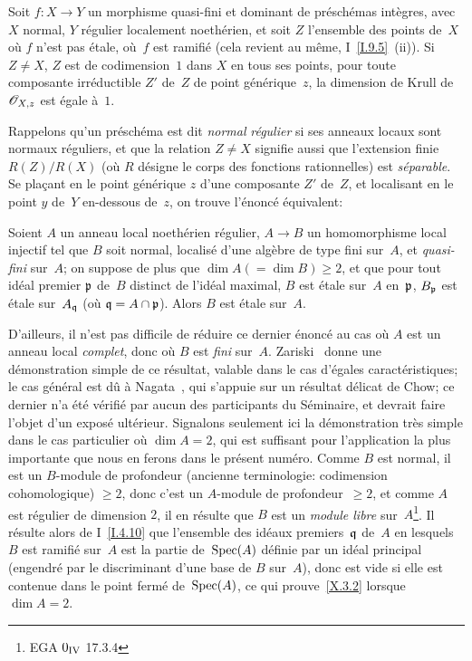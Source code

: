 \begin{theoremedepurete}
\label{X.3.1}
Soit $f\colon X\to Y$ un morphisme
quasi-fini et dominant de pr\'esch\'emas int\`egres, avec $X$
normal, $Y$ r\'egulier localement noeth\'erien, et soit $Z$
l'ensemble des points de~$X$ o\`u $f$ n'est pas \'etale,
\ie o\`u~$f$ est ramifi\'e (cela revient au m\^eme,
\textup{I~\ref{I.9.5}~(ii)}). Si $Z\ne X$, $Z$ est de codimension~$1$ dans
$X$ en tous ses points, \ie pour toute composante irr\'eductible
$Z'$ de~$Z$ de point g\'en\'erique~$z$, la dimension de Krull de
$\cal{O}_{X,z}$ est \'egale \`a~$1$.
\end{theoremedepurete}

Rappelons qu'un pr\'esch\'ema est dit \emph{normal}
\resp \emph{régulier} si ses anneaux locaux sont normaux
\resp r\'eguliers, et que la relation $Z\ne X$ signifie aussi que
l'extension finie $R(Z)/R(X)$ (o\`u $R$ d\'esigne le corps des
fonctions rationnelles) est \emph{séparable}. Se pla\c cant en
le point g\'en\'erique $z$ d'une composante $Z'$ de~$Z$, et
localisant en le point $y$ de~$Y$ en-dessous de~$z$, on trouve
l'\'enonc\'e \'equivalent:

\begin{corollaire}
\label{X.3.2}
Soient $A$ un anneau local noeth\'erien r\'egulier, $A\to B$ un
homomorphisme local injectif tel que $B$ soit normal, localis\'e
d'une alg\`ebre de type fini sur~$A$, et \emph{quasi-fini} sur~$A$;
on suppose de plus que $\dim A (=\dim B)\ge 2$, et que pour tout
id\'eal premier $\mathfrak{p}$ de~$B$ distinct de l'id\'eal maximal,
$B$ est \'etale sur~$A$ en~$\mathfrak{p}$, \ie $B_\mathfrak{p}$ est
\'etale sur~$A_\mathfrak{q}$ (o\`u $\mathfrak{q}=A\cap\mathfrak{p}$). Alors
$B$ est \'etale sur~$A$.
\end{corollaire}

D'ailleurs, il n'est pas difficile de r\'eduire ce dernier
\'enonc\'e au cas o\`u $A$ est un anneau local \emph{complet},
donc o\`u $B$ est \emph{fini} sur~$A$. Zariski~\cite{X.5} donne une
d\'emonstration simple de ce r\'esultat, valable dans le cas
d'\'egales caract\'eristiques; le cas g\'en\'eral est d\^u
\`a Nagata~\cite{X.3}, qui s'appuie sur un r\'esultat d\'elicat de
Chow; ce dernier n'a \'et\'e v\'erifi\'e par aucun des
participants du S\'eminaire, et devrait faire l'objet d'un
expos\'e ult\'erieur. Signalons seulement ici la d\'emonstration
tr\`es simple dans le cas particulier o\`u $\dim A=2$, qui est
suffisant pour l'application la plus importante que nous en ferons
dans le pr\'esent num\'ero. Comme $B$ est normal, il est un
$B$-module de profondeur (ancienne terminologie: codimension
cohomologique) $\ge 2$, donc c'est un $A$-module de profondeur~$\ge
2$, et comme $A$ est r\'egulier de dimension $2$, il en r\'esulte
que $B$ est un \emph{module libre} sur~$A$\footnote{\Cf EGA $0_{\textup{IV}}$
17.3.4}. Il r\'esulte alors de I~\ref{I.4.10} que l'ensemble
des id\'eaux premiers~$\mathfrak{q}$ de~$A$ en lesquels $B$ est
ramifi\'e sur~$A$ est la partie de~$\operatorname{Spec}(A)$ d\'efinie par un
id\'eal principal (engendr\'e par le discriminant d'une base de
$B$ sur~$A$), donc est vide si elle est contenue dans le point
ferm\'e de~$\operatorname{Spec}(A)$, ce qui prouve~\ref{X.3.2} lorsque $\dim A=2$.


